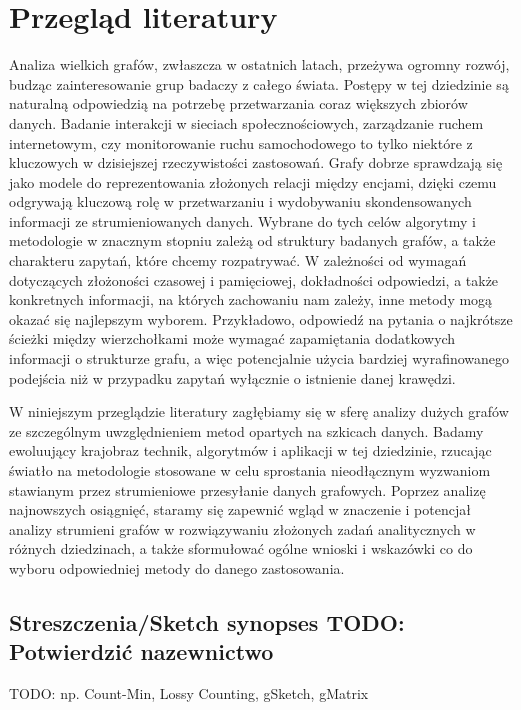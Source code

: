\chapter{Przegląd literatury}

    Analiza wielkich grafów, zwłaszcza w ostatnich latach, przeżywa ogromny rozwój, budząc zainteresowanie grup badaczy z całego świata. Postępy w tej dziedzinie są naturalną odpowiedzią na potrzebę przetwarzania coraz większych zbiorów danych. Badanie interakcji w sieciach społecznościowych, zarządzanie ruchem internetowym, czy monitorowanie ruchu samochodowego to tylko niektóre z kluczowych w dzisiejszej rzeczywistości zastosowań. Grafy dobrze sprawdzają się jako modele do reprezentowania złożonych relacji między encjami, dzięki czemu odgrywają kluczową rolę w przetwarzaniu i wydobywaniu skondensowanych informacji ze strumieniowanych danych. Wybrane do tych celów algorytmy i metodologie w znacznym stopniu zależą od struktury badanych grafów, a także charakteru zapytań, które chcemy rozpatrywać. W zależności od wymagań dotyczących złożoności czasowej i pamięciowej, dokładności odpowiedzi, a także konkretnych informacji, na których zachowaniu nam zależy, inne metody mogą okazać się najlepszym wyborem. Przykładowo, odpowiedź na pytania o najkrótsze ścieżki między wierzchołkami może wymagać zapamiętania dodatkowych informacji o strukturze grafu, a więc potencjalnie użycia bardziej wyrafinowanego podejścia niż w przypadku zapytań wyłącznie o istnienie danej krawędzi. 

    W niniejszym przeglądzie literatury zagłębiamy się w sferę analizy dużych grafów ze szczególnym uwzględnieniem metod opartych na szkicach danych. Badamy ewoluujący krajobraz technik, algorytmów i aplikacji w tej dziedzinie, rzucając światło na metodologie stosowane w celu sprostania nieodłącznym wyzwaniom stawianym przez strumieniowe przesyłanie danych grafowych. Poprzez analizę najnowszych osiągnięć, staramy się zapewnić wgląd w znaczenie i potencjał analizy strumieni grafów w rozwiązywaniu złożonych zadań analitycznych w różnych dziedzinach, a także sformułować ogólne wnioski i wskazówki co do wyboru odpowiedniej metody do danego zastosowania.

\section{Streszczenia/Sketch synopses TODO: Potwierdzić nazewnictwo}
    TODO: np. Count-Min\cite{Cormode_Muthukrishnan_2005}, Lossy Counting\cite{Manku_Motwani_2012}, gSketch\cite{Zhao_Aggarwal_Wang_2011}, gMatrix \cite{Khan_Aggarwal_2016}  

